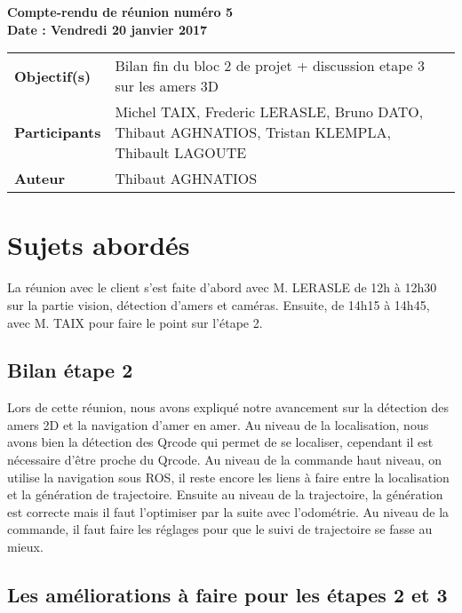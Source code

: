 \documentclass[a4wide,10pt]{article}
\begin{document}
\thispagestyle{empty}

\begin{center}
\LARGE \bfseries  Compte-rendu de réunion numéro 5 \\
\large \bfseries  Date : Vendredi 20 janvier 2017
\vspace{0.05cm}
\end{center}

\begin{center}
\begin{tabular}{ p{2.2cm}  p{13.6cm} }
\textbf{Objectif(s)} & Bilan fin du bloc 2 de projet + discussion etape 3 sur les amers 3D  \\
\textbf{Participants} & Michel TAIX, Frederic LERASLE, Bruno DATO, Thibaut AGHNATIOS, Tristan KLEMPLA, Thibault LAGOUTE  \\ 
\textbf{Auteur} & Thibaut AGHNATIOS  \\
\end{tabular}
\end{center}

\section*{Sujets abordés}

La réunion avec le client s'est faite d'abord avec M. LERASLE de 12h à 12h30 sur la partie vision, détection d'amers et caméras. Ensuite, de 14h15 à 14h45, avec M. TAIX pour faire le point sur l'étape 2.

\subsection*{Bilan étape 2}

Lors de cette réunion, nous avons expliqué notre avancement sur la détection des amers 2D et la navigation d'amer en amer. Au niveau de la localisation, nous avons bien la détection des 
Qrcode qui permet de se localiser, cependant il est nécessaire d'être proche du Qrcode. Au niveau de la commande haut niveau, on utilise la navigation sous ROS, il reste encore les liens à faire entre la localisation et la génération de trajectoire. Ensuite au niveau de la trajectoire, la génération est correcte mais il faut l'optimiser par la suite avec l'odométrie. Au niveau de la commande, il faut faire les réglages pour que le suivi de trajectoire se fasse au mieux.\\


\subsection*{Les améliorations à faire pour les étapes 2 et 3}
\end{document}
